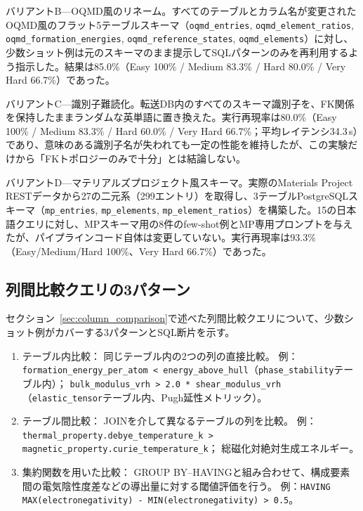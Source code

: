\documentclass[twocolumn]{interact}
\begin{document}
バリアントB---OQMD風のリネーム。すべてのテーブルとカラム名が変更されたOQMD風のフラット5テーブルスキーマ（\texttt{oqmd\_entries}, \texttt{oqmd\_element\_ratios}, \texttt{oqmd\_formation\_energies}, \texttt{oqmd\_reference\_states}, \texttt{oqmd\_elements}）に対し、少数ショット例は元のスキーマのまま提示してSQLパターンのみを再利用するよう指示した。結果は85.0\%（Easy 100\% / Medium 83.3\% / Hard 80.0\% / Very Hard 66.7\%）であった。

バリアントC---識別子難読化。転送DB内のすべてのスキーマ識別子を、FK関係を保持したままランダムな英単語に置き換えた。実行再現率は80.0\%（Easy 100\% / Medium 83.3\% / Hard 60.0\% / Very Hard 66.7\%；平均レイテンシ34.3\,s）であり、意味のある識別子名が失われても一定の性能を維持したが、この実験だけから「FKトポロジーのみで十分」とは結論しない。

バリアントD---マテリアルズプロジェクト風スキーマ。実際のMaterials Project RESTデータから27の二元系（299エントリ）を取得し、3テーブルPostgreSQLスキーマ（\texttt{mp\_entries}, \texttt{mp\_elements}, \texttt{mp\_element\_ratios}）を構築した。15の日本語クエリに対し、MPスキーマ用の8件のfew-shot例とMP専用プロンプトを与えたが、パイプラインコード自体は変更していない。実行再現率は93.3\%（Easy/Medium/Hard 100\%、Very Hard 66.7\%）であった。

\subsection{列間比較クエリの3パターン}
\label{sec:sup_column_comparison}

セクション~\ref{sec:column_comparison}で述べた列間比較クエリについて、少数ショット例がカバーする3パターンとSQL断片を示す。
\begin{enumerate}  
  \item テーブル内比較：  
    同じテーブル内の2つの列の直接比較。  
    例：\texttt{formation\_energy\_per\_atom < energy\_above\_hull}（\texttt{phase\_stability}テーブル内）；  
    \texttt{bulk\_modulus\_vrh > 2.0 * shear\_modulus\_vrh}（\texttt{elastic\_tensor}テーブル内、Pugh延性メトリック）。  
  \item テーブル間比較：  
    JOINを介して異なるテーブルの列を比較。  
    例：\texttt{thermal\_property.debye\_temperature\_k > magnetic\_property.curie\_temperature\_k}；  
    総磁化対絶対生成エネルギー。  
  \item 集約関数を用いた比較：  
    GROUP BY--HAVINGと組み合わせて、構成要素間の電気陰性度差などの導出量に対する閾値評価を行う。  
    例：\texttt{HAVING MAX(electronegativity) - MIN(electronegativity) > 0.5}。  
\end{enumerate}
\end{document}
